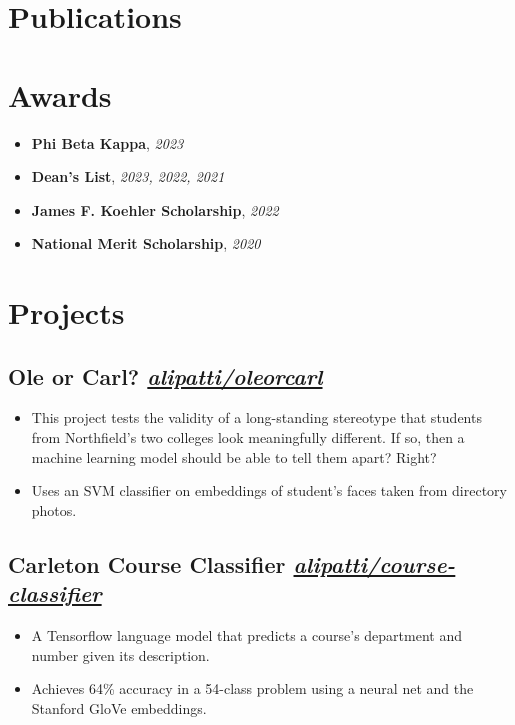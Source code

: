\documentclass{ali-resume}
\begin{document}
\null

\section{Publications}



\section{Awards}

\newcommand{\award}[2]{\textbf{#1}, \textit{#2}}

\begin{itemize}[label={}, leftmargin=0em]
	\item \award{Phi Beta Kappa}{2023}
	\item \award{Dean's List}{2023, 2022, 2021}
	\item \award{James F. Koehler Scholarship}{2022}
	\item \award{National Merit Scholarship}{2020}
\end{itemize}

\section{Projects}

\newcommand{\project}[2]{%
	\subsection{#1
		\hfill
		\normalfont \small \faicon{github}
		\href{http://github.com/alipatti/#2}{\textit{alipatti/#2}}
	}}

\project{Ole or Carl?}{oleorcarl}

\begin{itemize}
	\item This project tests the validity of a long-standing stereotype that students from Northfield's two colleges look meaningfully different. If so, then a machine learning model should be able to tell them apart? Right?
	\item Uses an SVM classifier on embeddings of student's faces taken from directory photos.
\end{itemize}

\project{Carleton Course Classifier}{course-classifier}

\begin{itemize}
	\item A Tensorflow language model that predicts a course's department and number given its description.
	\item Achieves 64\% accuracy in a 54-class problem using a neural net and the Stanford GloVe embeddings.
\end{itemize}
\end{document}

